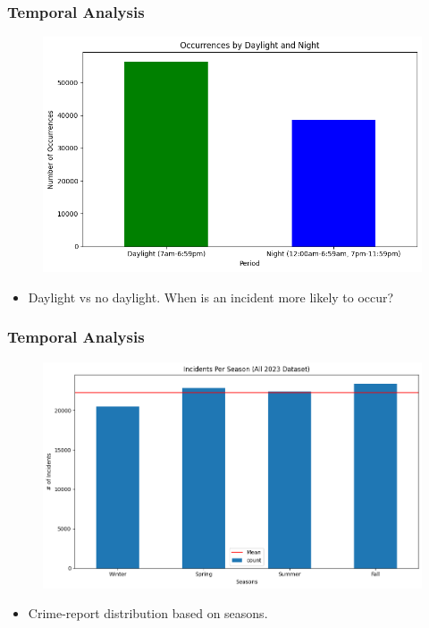 \documentclass{beamer}
\begin{document}
\begin{frame}
    \frametitle{Temporal Analysis}
        \begin{figure}
            \flushleft
            \includegraphics[width=1\linewidth]{Figures/Daylight_and_Night.png}
        \end{figure}
        {\scriptsize %
        \begin{itemize}
            \item  Daylight vs no daylight. When is an incident more likely to occur?
        \end{itemize}
        }
\end{frame}





\begin{frame}
    \frametitle{Temporal Analysis}
        \begin{figure}
            \flushleft
            \includegraphics[width=1\linewidth]{Figures/Incidents Per Season (All 2023 Dataset).png}
        \end{figure}
        {\scriptsize %
        \begin{itemize}
            \item  Crime-report distribution based on seasons.
        \end{itemize}
        }
\end{frame}
\end{document}
